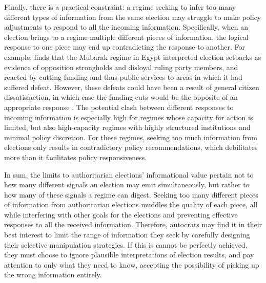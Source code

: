 \documentclass[12pt]{article}
\newcommand{\1}{\mathbbm{1}}
\begin{document}
Finally, there is a practical constraint: a regime seeking to infer too many different types of information from the same election may struggle to make policy adjustments to respond to all the incoming information. Specifically, when an election brings to a regime multiple different pieces of information, the logical response to one piece may end up contradicting the response to another. For example, \citet{Blaydes2010} finds that the Mubarak regime in Egypt interpreted election setbacks as evidence of opposition strongholds and disloyal ruling party members, and reacted by cutting funding and thus public services to areas in which it had suffered defeat. However, these defeats could have been a result of general citizen dissatisfaction, in which case the funding cuts would be the opposite of an appropriate response \citep{Miller2015}. The potential clash between different responses to incoming information is especially high for regimes whose capacity for action is limited, but also high-capacity regimes with highly structured institutions and minimal policy discretion. For these regimes, seeking too much information from elections only results in contradictory policy recommendations, which debilitates more than it facilitates policy responsiveness.

In sum, the limits to authoritarian elections' informational value pertain not to how many different signals an election may emit simultaneously, but rather to how many of these signals a regime can digest. Seeking too many different pieces of information from authoritarian elections muddles the quality of each piece, all while interfering with other goals for the elections and preventing effective responses to all the received information. Therefore, autocrats may find it in their best interest to limit the range of information they seek by carefully designing their selective manipulation strategies. If this is cannot be perfectly achieved, they must choose to ignore plausible interpretations of election results, and pay attention to only what they need to know, accepting the possibility of picking up the wrong information entirely.


\end{document}
